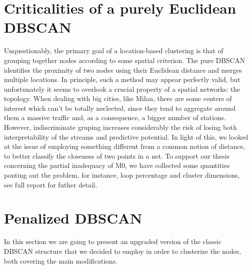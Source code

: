\documentclass[11pt,twoside]{report}
\begin{document}
\section{Criticalities of a purely Euclidean DBSCAN}
Unquestionably, the primary goal of a location-based clustering is that of grouping  together nodes according to some spatial criterion. The pure DBSCAN identifies the proximity of two nodes using their Euclidean distance and merges multiple locations. In principle, such a method may appear perfectly valid, but unfortunately it seems to overlook a crucial property of a spatial networks: the topology. When dealing with big cities, like Milan, there are some centers of interest which can't be totally neclected, since they tend to aggregate around them a massive traffic and, as a consequence, a bigger number of stations. However, indiscriminate gruping increases considerably the risk of losing both interpretability of the streams and predictive potential. In light of this, we looked at the issue of employing something different from a common notion of distance, to better classify the closeness of two points in a net. To support our thesis concerning the partial inadequacy of M0, we have collected some quantities ponting out the problem, for instance, loop percentage and cluster dimensions, see full report for futher detail.

\section{Penalized DBSCAN}
In this section we are going to present an upgraded version of the classic DBSCAN structure that we decided to employ in order to clusterize the nodes, both covering the main modifications.
\end{document}

